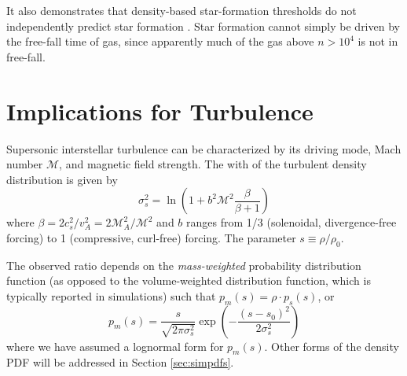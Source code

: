 It also demonstrates that density-based star-formation thresholds do not
independently predict star formation \citep{Parmentier2011a}.  Star formation
cannot simply be driven by the free-fall time of gas, since apparently much of
the gas above $n>10^4$ \percc is not in free-fall.

%



\section{Implications for Turbulence}
Supersonic interstellar turbulence can be characterized by its driving mode,
Mach number $\mathcal{M}$, and magnetic field strength.  The with of the turbulent density distribution
is given by
\begin{equation}
    \label{eqn:sigmas}
    \sigma_s^2 = \ln\left(1+b^2 \mathcal{M}^2 \frac{\beta}{\beta+1}\right)
\end{equation}
where $\beta= 2 c_s^2/v_A^2 = 2 \mathcal{M}_A^2/\mathcal{M}^2$ and $b$ ranges
from 1/3 (solenoidal, divergence-free forcing) to 1 (compressive, curl-free)
forcing.  The parameter $s\equiv\rho/\rho_0$.

The observed \formaldehyde ratio depends on the \emph{mass-weighted}
probability distribution function (as opposed to the volume-weighted
distribution function, which is typically reported in simulations)
such that $p_m(s) = \rho \cdot p_s(s)$, or
\begin{equation}
    \label{eqn:lognormal}
    p_m(s) = \frac{s}{\sqrt{2 \pi \sigma_s^2}} \exp{\left(-\frac{(s-s_0)^2}{2 \sigma_s^2}\right)}
\end{equation}
where we have assumed a lognormal form for $p_m(s)$.  Other forms of the density PDF will be
addressed in Section \ref{sec:simpdfs}.

